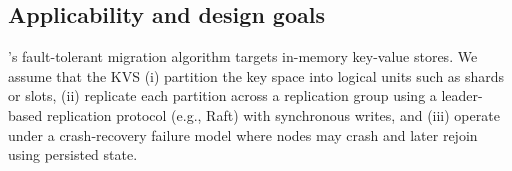 \subsection{Applicability and design goals}
\label{sec:applicability}




\OurImplementation{}'s fault-tolerant migration algorithm targets in-memory key-value stores. 
We assume that the KVS (i) partition the key space into logical units such as shards or slots, (ii) replicate each partition across a replication group using a leader-based replication protocol (e.g., Raft) with synchronous writes, and (iii) operate under a crash-recovery failure model where nodes may crash and later rejoin using persisted state. 

